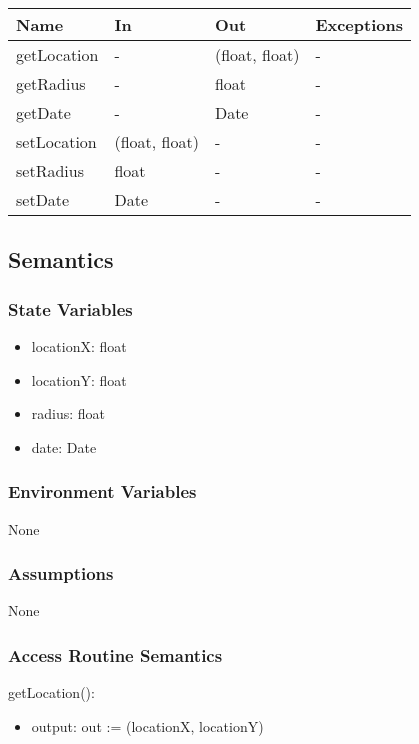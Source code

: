 \documentclass[12pt, titlepage]{article}
\begin{document}
\begin{center}
\begin{tabular}{p{3.2cm} p{4cm} p{4cm} p{2cm}}
\hline
\textbf{Name} & \textbf{In} & \textbf{Out} & \textbf{Exceptions} \\
\hline
getLocation & - & (float, float) & - \\
getRadius & - & float & - \\
getDate & - & Date & - \\
setLocation & (float, float) & - & - \\
setRadius & float & - & - \\
setDate & Date & - & - \\
\hline
\end{tabular}
\end{center}

\subsection{Semantics}

\subsubsection{State Variables}
\begin{itemize}
    \item locationX: float
    \item locationY: float
    \item radius: float
    \item date: Date
\end{itemize}
\subsubsection{Environment Variables}
None

\subsubsection{Assumptions}
None

\subsubsection{Access Routine Semantics}

\noindent getLocation():
\begin{itemize}
\item output: out := (locationX, locationY)
\end{itemize}
\end{document}
